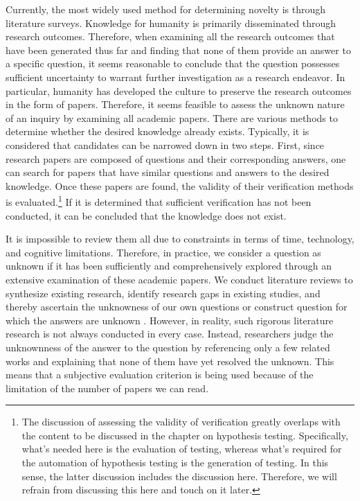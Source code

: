\documentclass{book}
\begin{document}
Currently, the most widely used method for determining novelty is through literature surveys. Knowledge for humanity is primarily disseminated through research outcomes. Therefore, when examining all the research outcomes that have been generated thus far and finding that none of them provide an answer to a specific question, it seems reasonable to conclude that the question possesses sufficient uncertainty to warrant further investigation as a research endeavor. In particular, humanity has developed the culture to preserve the research outcomes in the form of papers. Therefore, it seems feasible to assess the unknown nature of an inquiry by examining all academic papers. There are various methods to determine whether the desired knowledge already exists. Typically, it is considered that candidates can be narrowed down in two steps. First, since research papers are composed of questions and their corresponding answers, one can search for papers that have similar questions and answers to the desired knowledge. Once these papers are found, the validity of their verification methods is evaluated.\footnote{
The discussion of assessing the validity of verification greatly overlaps with the content to be discussed in the chapter on hypothesis testing. Specifically, what's needed here is the evaluation of testing, whereas what's required for the automation of hypothesis testing is the generation of testing. In this sense, the latter discussion includes the discussion here. Therefore, we will refrain from discussing this here and touch on it later.
} If it is determined that sufficient verification has not been conducted, it can be concluded that the knowledge does not exist. 

It is impossible to review them all due to constraints in terms of time, technology, and cognitive limitations. Therefore, in practice, we consider a question as unknown if it has been sufficiently and comprehensively explored through an extensive examination of these academic papers. We conduct literature reviews to synthesize existing research, identify research gaps in existing studies, and thereby ascertain the unknowness of our own questions or construct question for which the answers are unknown \cite{schryen2015theory}. However, in reality, such rigorous literature research is not always conducted in every case. Instead, researchers judge the unknownness of the answer to the question by referencing only a few related works and explaining that none of them have yet resolved the unknown. This means that a subjective evaluation criterion is being used because of the limitation of the number of papers we can read. 
\end{document}
